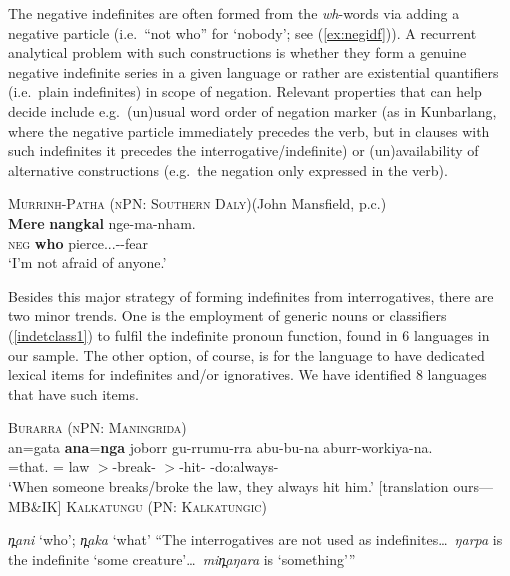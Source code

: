 \documentclass[12pt,egregdoesnotlikesansseriftitles]{scrartcl}
\begin{document}
The negative indefinites are often formed from the \textit{wh}-words via adding a negative particle (i.e.\ ``not who'' for `nobody'; see (\ref{ex:negidf})). A recurrent analytical problem with such constructions is whether they form a genuine negative indefinite series in a given language or rather are existential quantifiers (i.e.\ plain indefinites) in scope of negation. %
Relevant properties that can help decide include e.g.\ (un)usual word order of negation marker (as in Kunbarlang, where the negative particle immediately precedes the verb, but in clauses with such indefinites it precedes the interrogative/indefinite) or (un)availability of alternative constructions (e.g.\ the negation only expressed in the verb).
\begin{exe}
  \ex\label{ex:negidf} \textsc{Murrinh-Patha (nPN: Southern Daly)}\hfill (John Mansfield, p.c.)\\
  \gll \textbf{Mere} \textbf{nangkal} nge-ma-nham.\\
  \textsc{neg}  \textbf{who}      pierce.\Rr.\Fsg.\Irr-\Appl-fear\\
  \glt `I'm not afraid of anyone.' %
\end{exe}

Besides this major strategy of forming indefinites from interrogatives, there are two minor trends. One is the employment of generic nouns or classifiers (\ref{indetclass1}) to fulfil the indefinite pronoun function, found in 6 languages in our sample. The other option, of course, is for the language to have dedicated lexical items for indefinites and/or ignoratives. We have identified 8 languages that have such items.
\begin{exe}
  \ex\label{indetclass1} \textsc{Burarra (nPN: Maningrida)}\hfill {}\\
  \gll an=gata    \textbf{ana}=\textbf{nga}            joborr    gu-rrumu-rra  abu-bu-na            aburr-workiya-na.\\
  \Third\Min=that.\Rcgn{}   \Third\Min\Hum=\Indet{}   law     \Third\Min$>$\Third\Min-break-\Pc{}  \Third\Aug$>$\Third\Min-hit-\Pc{}    \Third\Aug-do:always-\Pc\\
  \glt %
  `When someone breaks/broke the law, they always hit him.' [translation ours---MB\&IK]
  \ex \textsc{Kalkatungu (PN: Kalkatungic)}\hfill {}
  \begin{xlist}
    \ex \textit{\charis n̪ani} `who'; \textit{\charis n̪aka} `what'
    \ex ``The interrogatives are not used as indefinites\ldots\ \textit{\charis ŋarpa} is the indefinite `some creature'\ldots\ \textit{\charis min̪aŋara} is `something'\thinspace''
  \end{xlist}
\end{exe}
\end{document}

